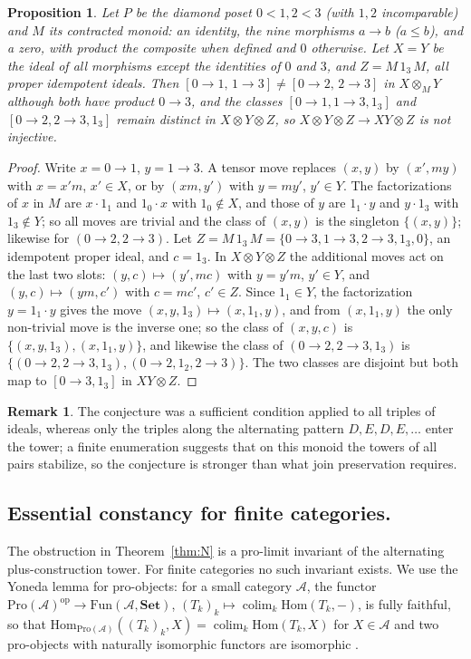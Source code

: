 \documentclass[11pt]{amsart}
\newtheorem{prop}[thm]{Proposition}
\theoremstyle{definition}
\newtheorem{rem}[thm]{Remark}
\newcommand{\Hom}{\mathrm{Hom}}
\newcommand{\Fun}{\mathrm{Fun}}
\begin{document}
\begin{prop}\label{prop:diamond}
Let $P$ be the diamond poset $0<1,2<3$ (with $1,2$ incomparable) and $M$ its
contracted monoid: an identity, the nine morphisms $a\to b$ ($a\le b$), and a
zero, with product the composite when defined and $0$ otherwise. Let
$X=Y$ be the ideal of all morphisms except the identities of $0$ and $3$, and
$Z=M\,1_3\,M$, all proper idempotent ideals. Then
$[0\to1,\,1\to3]\ne[0\to2,\,2\to3]$ in $X\otimes_MY$ although both have product
$0\to3$, and the classes $[0\to1,1\to3,1_3]$ and $[0\to2,2\to3,1_3]$ remain
distinct in $X\otimes Y\otimes Z$, so $X\otimes Y\otimes Z\to XY\otimes Z$ is not
injective.
\end{prop}
\begin{proof}
Write $x=0\to1$, $y=1\to3$. A tensor move replaces $(x,y)$ by $(x',my)$ with
$x=x'm$, $x'\in X$, or by $(xm,y')$ with $y=my'$, $y'\in Y$. The factorizations
of $x$ in $M$ are $x\cdot1_1$ and $1_0\cdot x$ with $1_0\notin X$, and those of
$y$ are $1_1\cdot y$ and $y\cdot1_3$ with $1_3\notin Y$; so all moves are trivial
and the class of $(x,y)$ is the singleton $\{(x,y)\}$; likewise for
$(0\to2,2\to3)$. Let $Z=M\,1_3\,M=\{0\to3,1\to3,2\to3,1_3,0\}$, an idempotent
proper ideal, and $c=1_3$. In $X\otimes Y\otimes Z$ the additional moves act on
the last two slots: $(y,c)\mapsto(y',mc)$ with $y=y'm$, $y'\in Y$, and
$(y,c)\mapsto(ym,c')$ with $c=mc'$, $c'\in Z$. Since $1_1\in Y$, the
factorization $y=1_1\cdot y$ gives the move $(x,y,1_3)\mapsto(x,1_1,y)$, and
from $(x,1_1,y)$ the only non-trivial move is the inverse one; so the class of
$(x,y,c)$ is $\{(x,y,1_3),(x,1_1,y)\}$, and likewise the class of
$(0\to2,2\to3,1_3)$ is $\{(0\to2,2\to3,1_3),(0\to2,1_2,2\to3)\}$. The two classes
are disjoint but both map to $[0\to3,1_3]$ in $XY\otimes Z$.
\end{proof}

\begin{rem}
The conjecture was a sufficient condition applied to all triples of ideals,
whereas only the triples along the alternating pattern $D,E,D,E,\dots$ enter
the tower; a finite enumeration suggests that on this monoid the towers of all
pairs stabilize, so the conjecture is stronger than what join preservation
requires.
\end{rem}

\subsection{Essential constancy for finite categories.}
The obstruction in Theorem~\ref{thm:N} is a pro-limit invariant of the
alternating plus-construction tower. For finite categories no such invariant
exists. We use the Yoneda lemma for pro-objects: for a small category
$\mathcal A$, the functor $\mathrm{Pro}(\mathcal A)^{\mathrm{op}}\to\Fun(\mathcal A,\mathbf{Set})$,
$(T_k)_k\mapsto\operatorname{colim}_k\Hom(T_k,-)$, is fully faithful, so that
$\Hom_{\mathrm{Pro}(\mathcal A)}((T_k)_k,X)=\operatorname{colim}_k\Hom(T_k,X)$ for
$X\in\mathcal A$ and two pro-objects with naturally isomorphic functors are
isomorphic \cite[\S6.1]{KS}.
\end{document}
